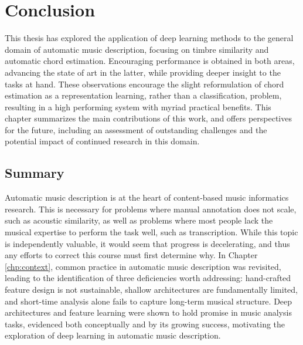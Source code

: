 \graphicspath{{8/figures/}}
\chapter{Conclusion}
\label{chp:conclusion}

This thesis has explored the application of deep learning methods to the general domain of automatic music description, focusing on timbre similarity and automatic chord estimation.
Encouraging performance is obtained in both areas, advancing the state of art in the latter, while providing deeper insight to the tasks at hand.
These observations encourage the slight reformulation of chord estimation as a representation learning, rather than a classification, problem, resulting in a high performing system with myriad practical benefits.
This chapter summarizes the main contributions of this work, and offers perspectives for the future, including an assessment of outstanding challenges and the potential impact of continued research in this domain.

\section{Summary}

Automatic music description is at the heart of content-based music informatics research.
This is necessary for problems where manual annotation does not scale, such as acoustic similarity, as well as problems where most people lack the musical expertise to perform the task well, such as transcription.
While this topic is independently valuable, it would seem that progress is decelerating, and thus any efforts to correct this course must first determine why.
In Chapter \ref{chp:context}, common practice in automatic music description was revisited, leading to the identification of three deficiencies worth addressing:
hand-crafted feature design is not sustainable, shallow architectures are fundamentally limited, and short-time analysis alone fails to capture long-term musical structure.
Deep architectures and feature learning were shown to hold promise in music analysis tasks, evidenced both conceptually and by its growing success, motivating the exploration of deep learning in automatic music description.

